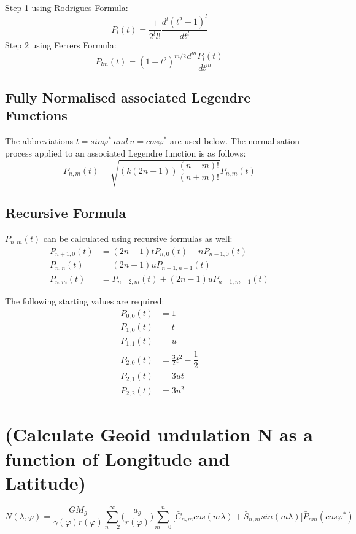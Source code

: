 Step 1 using Rodrigues Formula:
\begin{equation} 
P_{l}(t) = \dfrac{1}{2^{l}l!}\dfrac{d^{l}(t^{2}-1)^{l}}{dt^{l}}
\end{equation}
Step 2 using Ferrers Formula:
\begin{equation} 
P_{lm}(t) = (1-t^{2})^{m/2}\dfrac{d^{m}P_{l}(t)}{dt^{m}}
\end{equation}

\subsection{Fully Normalised associated Legendre Functions}
The abbreviations $ t=sin \varphi^{*} \ and \ u=cos\varphi^{*} $ are used below. The normalisation process applied to an associated Legendre function is as follows:
\begin{equation} 
\bar{P}_{n,m}(t) = \sqrt{(k(2n+1))\dfrac{(n-m)!}{(n+m)!}}P_{n,m}(t)
\end{equation}

\subsection{Recursive Formula}
$ P_{n,m}(t) $ can be calculated using recursive formulas as well:
\begin{equation} 
\begin{aligned}
P_{n+1,0}(t) & = (2n+1) t P_{n,0}(t) - nP_{n-1,0}(t) \\
P_{n,n}(t) & = (2n-1) u P_{n-1,n-1}(t) \\
P_{n,m}(t) & = P_{n-2,m}(t)+(2n-1)uP_{n-1,m-1}(t)
\end{aligned}
\end{equation}

The following starting values are required:
\begin{equation} 
\begin{aligned}
P_{0,0}(t) & = 1 \\
P_{1,0}(t) & = t \\
P_{1,1}(t) & = u \\
P_{2,0}(t) & = \frac{3}{2} t^{2} - \dfrac{1}{2}\\
P_{2,1}(t) & = 3ut \\
P_{2,2}(t) & = 3u^{2} 
\end{aligned}
\end{equation}


\section{(Calculate Geoid undulation N as a function of Longitude and Latitude)}
\begin{equation} 
N(\lambda,\varphi)=\dfrac{GM_{g}}{\gamma(\varphi)r(\varphi)}\sum\limits_{n=2}^\infty  \big( \dfrac{a_{g}}{r(\varphi)} \big) \sum\limits_{m=0}^n 
\Big[  \bar{C}_{n,m}cos(m\lambda) +  \bar{S}_{n,m}sin(m\lambda)   \Big] \bar{P}_{nm}(cos\varphi^{*})
\end{equation}
	
